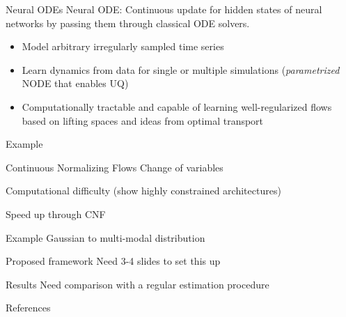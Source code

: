 \documentclass{beamer}
\begin{document}
\begin{frame}{Neural ODEs}
    Neural ODE: Continuous update for hidden states of neural networks by passing them through classical ODE solvers.

    \begin{itemize}
        \item Model arbitrary irregularly sampled time series

        \item Learn dynamics from data for single or multiple simulations (\emph{parametrized} NODE that enables UQ)

        \item Computationally tractable and capable of learning well-regularized flows based on lifting spaces and ideas from optimal transport
    \end{itemize}
\end{frame}

\begin{frame}{Example}
    
\end{frame}

\begin{frame}{Continuous Normalizing Flows}
    Change of variables

    Computational difficulty (show highly constrained architectures)

    Speed up through CNF
\end{frame}

\begin{frame}{Example}
    Gaussian to multi-modal distribution
\end{frame}

\begin{frame}{Proposed framework}
    Need 3-4 slides to set this up
\end{frame}

\begin{frame}{Results}
    Need comparison with a regular estimation procedure
\end{frame}

\begin{frame}{References}
    \nocite{*}
    \printbibliography
\end{frame}
\end{document}
